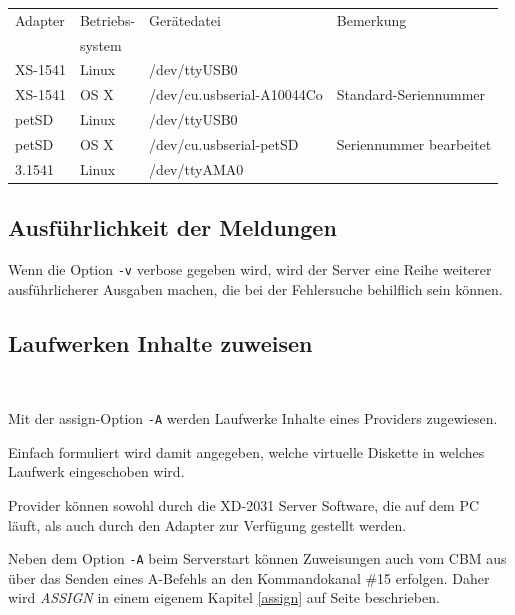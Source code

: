 \documentclass[10pt,a4paper]{scrartcl}		%
\begin{document}
\begin{tabular}[c]{l l l l}
\toprule 
Adapter & Betriebs- & Gerätedatei & Bemerkung\\
& system & & \\
\midrule
XS-1541 & Linux & /dev/ttyUSB0 & \\
XS-1541 & OS X & /dev/cu.usbserial-A10044Co & Standard-Seriennummer \\
petSD & Linux & /dev/ttyUSB0 & \\
petSD & OS X & /dev/cu.usbserial-petSD & Seriennummer bearbeitet \\
3.1541 & Linux & /dev/ttyAMA0 \\
\bottomrule
\end{tabular}

\subsection{Ausführlichkeit der Meldungen}
\mbox{}

Wenn die Option \texttt{-v} \glqq{}verbose\grqq{} gegeben wird,
wird der Server eine Reihe weiterer ausführlicherer
Ausgaben machen, die bei der Fehlersuche behilflich sein können.

\subsection{Laufwerken Inhalte zuweisen}
\mbox{ \Big[ \texttt{-A}\textit{<Laufwerk-Nummer>} 
\texttt{:} \textit{<Provider>} \texttt{=}
\textit{<Parameter>} \Big] \Big[ \ldots \Big] }

Mit der \glqq{}assign\grqq{}-Option \texttt{-A} werden Laufwerke Inhalte
eines Providers zugewiesen. 

Einfach formuliert wird damit angegeben,
welche \glqq{}virtuelle Diskette\grqq{} in welches Laufwerk
eingeschoben wird. 

Provider können sowohl durch die XD-2031 Server Software,
die auf dem PC läuft, als auch durch den Adapter zur Verfügung
gestellt werden.

Neben dem Option \texttt{-A} beim
Serverstart können Zuweisungen auch vom CBM aus über das
Senden eines A-Befehls an den Kommandokanal \#15 erfolgen.  
Daher wird \textit{ASSIGN} in einem eigenem
Kapitel \ref{assign} \glqq{}\grqq{} 
auf Seite \pageref{assign} beschrieben.

\end{document}
